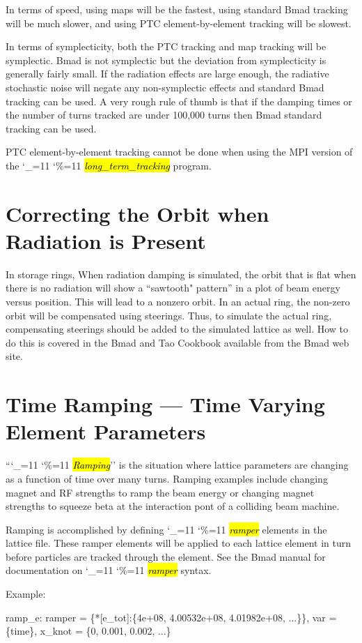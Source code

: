 \documentclass{hitec}
\newcommand\dottcmd[1]{\hl{\em#1}\endgroup}
\newcommand{\vn}{\begingroup\catcode`\_=11 \catcode`\%=11 \dottcmd}
\newcommand{\ltt}{\vn{long_term_tracking}\xspace}
\newcommand{\Section}[1]{\section{#1}\vspace*{-1ex}}
\begin{document}
{{{{{{{{{{{{{In terms of speed, using maps will be the fastest, using standard Bmad tracking will be much
slower, and using PTC element-by-element tracking will be slowest.

In terms of symplecticity, both the PTC tracking and map tracking will be symplectic.
Bmad is not symplectic but the deviation from symplecticity is generally fairly small. If the
radiation effects are large enough, the radiative stochastic noise will negate any non-symplectic
effects and standard Bmad tracking can be used. A very rough rule of thumb is that if the damping times
or the number of turns tracked are under 100,000 turns then Bmad standard tracking can be used.

PTC element-by-element tracking cannot be done when using the MPI version of the \ltt program.

\Section{Correcting the Orbit when Radiation is Present}

In storage rings, When radiation damping is simulated, the orbit that is flat when there is no
radiation will show a ``sawtooth" pattern'' in a plot of beam energy versus position. This will lead
to a nonzero orbit. In an actual ring, the non-zero orbit will be compensated using steerings. Thus,
to simulate the actual ring, compensating steerings should be added to the simulated lattice as
well. How to do this is covered in the Bmad and Tao Cookbook available from the Bmad web site.

\Section{Time Ramping --- Time Varying Element Parameters}
\label{s:ramp}

``\vn{Ramping}'' is the situation where lattice parameters are changing as a function of time over
many turns. Ramping examples include changing magnet and RF strengths to ramp the beam energy or
changing magnet strengths to squeeze beta at the interaction pont of a colliding beam machine.

Ramping is accomplished by defining \vn{ramper} elements in the lattice file. These ramper elements
will be applied to each lattice element in turn before particles are tracked through the
element. See the Bmad manual for documentation on \vn{ramper} syntax.

Example:
\begin{code}
  ramp_e: ramper = \{*[e_tot]:\{4e+08, 4.00532e+08, 4.01982e+08, ...\}\},
                var = \{time\}, x_knot = \{0, 0.001, 0.002, ...\}


\end{code}}}}}}}}}}}}}}
\end{document}

